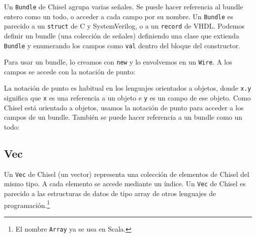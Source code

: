\documentclass[%
    10pt,
    headinclude, footinclude=false,
    openright, %
    notitlepage,
    cleardoublepage=empty,
    headsepline,
    numbers=noenddot,
    bibliography=totoc, index=totoc,
    ]{scrbook}
\newcommand{\code}[1]{{\lstinline[basicstyle=\small\ttfamily]{#1}}}
\newcommand{\codefoot}[1]{{\lstinline[basicstyle=\footnotesize\ttfamily]{#1}}}
\begin{document}
Un \code{Bundle} de Chisel agrupa varias señales. Se puede hacer referencia al bundle entero
como un todo, o acceder a cada campo por su nombre.
Un \code{Bundle} es parecido a un \code{struct} de C y SystemVerilog, o a un \code{record} de VHDL.
Podemos definir un bundle (una colección de señales) definiendo una clase que
extienda \code{Bundle} y enumerando los campos como \code{val} dentro del bloque del constructor.



\noindent Para usar un bundle, lo creamos con \code{new} y lo envolvemos en un \code{Wire}.
A los campos se accede con la notación de punto:



La notación de punto es habitual en los lenguajes orientados a objetos, donde \code{x.y} significa
que \code{x} es una referencia a un objeto e \code{y} es un campo de ese objeto.
Como Chisel está orientado a objetos, usamos la notación de punto para acceder a los
\newpage 
campos de un bundle. También se puede hacer referencia a un bundle como un todo:


\subsection{Vec}


Un \code{Vec} de Chisel (un vector) representa una colección de elementos de Chisel del mismo tipo.
A cada elemento se accede mediante un índice. Un \code{Vec} de Chisel es parecido
a las estructuras de datos de tipo array de otros lenguajes de programación.\footnote{El nombre
\codefoot{Array} ya se usa en Scala.}
\end{document}
